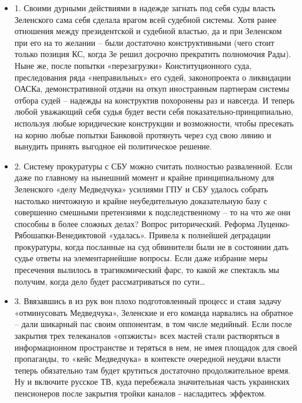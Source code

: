 \begin{itemize}
	
\item 1. Своими дурными действиями в надежде загнать под себя суды власть Зеленского
сама себя сделала врагом всей судебной системы. Хотя ранее отношения между
президентской и судебной властью, да и при Зеленском при его на то желании –
были достаточно конструктивными (чего стоит только позиция КС, когда Зе решил
досрочно прекратить полномочия Рады). Ныне же, после попытки «перезагрузки»
Конституционного суда, преследования ряда «неправильных» его судей,
законопроекта о ликвидации ОАСКа, демонстративной отдачи на откуп иностранным
партнерам системы отбора судей – надежды на конструктив похоронены раз и
навсегда. И теперь любой уважающий себя судья будет вести себя
показательно-принципиально, используя любые юридические конструкции и
возможности, чтобы пресекать на корню любые попытки Банковой протянуть через
суд свою линию и вынудить принять выгодное ей политическое решение.

\item 2. Систему прокуратуры с СБУ можно считать полностью разваленной. Если даже по
главному на нынешний момент и крайне принципиальному для Зеленского «делу
Медведчука» усилиями ГПУ и СБУ удалось собрать настолько ничтожную и крайне
неубедительную доказательную базу с совершенно смешными претензиями к
подследственному – то на что же они способны в более сложных делах? Вопрос
риторический. Реформа Луценко-Рябошапки-Венедиктовой «удалась». Привела к
полнейшей деградации прокуратуры, когда посланные на суд обвинители были не в
состоянии дать судье ответы на элементарнейшие вопросы. Если даже избрание меры
пресечения вылилось в трагикомический фарс, то какой же спектакль мы получим,
когда дело будет рассматриваться по сути… 

\item 3. Ввязавшись в из рук вон плохо подготовленный процесс и ставя задачу
«отминусовать Медведчука», Зеленские и его команда нарвались на обратное – дали
шикарный пас своим оппонентам, в том числе медийный. Если после закрытия трех
телеканалов «опзжисты» всех мастей стали растворяться в информационном
пространстве и теряться в нем, не имея площадок для своей пропаганды, то «кейс
Медведчука» в контексте очередной неудачи власти теперь обязательно там будет
крутиться достаточно продолжительное время. Ну и включите русское ТВ, куда
перебежала значительная  часть украинских пенсионеров после закрытия тройки
каналов - насладитесь эффектом.
\end{itemize}

